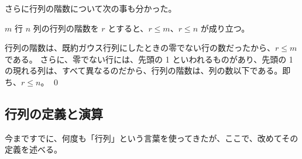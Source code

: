 さらに行列の階数について次の事も分かった。

\begin{prop} \label{prop:rank}
$m$ 行 $n$ 列の行列の階数を $r$ とすると、$r\leq m$、$r\leq n$ が成り立つ。
\end{prop}
\proof
行列の階数は、既約ガウス行列にしたときの零でない行の数だったから、$r\leq m$ である。
さらに、零でない行には、先頭の 1 といわれるものがあり、先頭の 1 の現れる列は、すべて異なるのだから、行列の階数は、列の数以下である。即ち、$r\leq n$。
\qed

\newpage
{}
\subsection{行列の定義と演算}
今まですでに、何度も「行列」という言葉を使ってきたが、ここで、改めてその定義を述べる。

